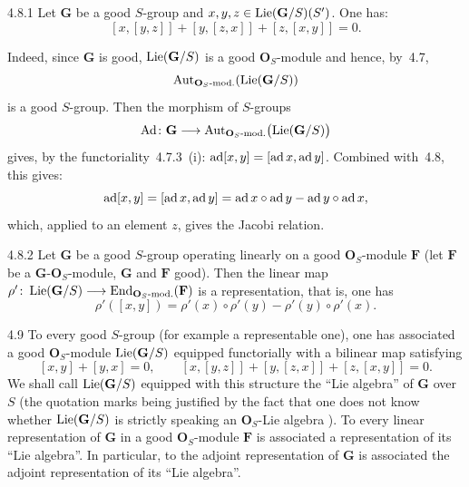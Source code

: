\begin{corollary}{4.8.1}\label{II.4.8.1}
Let \(\mathbf{G}\) be a good \(S\)-group and
\(x,y,z\in\operatorname{Lie}(\mathbf{G}/S)(S')\). One has:
\[
[x,[y,z]]+[y,[z,x]]+[z,[x,y]]=0.
\]
\end{corollary}

{\renewcommand{\thefootnote}{(82)}}
Indeed, since \(\mathbf{G}\) is good, \(\operatorname{Lie}(\mathbf{G}/S)\) is a good
\(\mathbf{O}_{S}\)-module and hence, by~4.7,
\[
\operatorname{Aut}_{\mathbf{O}_{S}\textup{-mod.}}(\operatorname{Lie}(\mathbf{G}/S))
\]
is a good \(S\)-group. Then
the morphism of \(S\)-groups
\[
\operatorname{Ad}\colon\mathbf{G}\longrightarrow
\operatorname{Aut}_{\mathbf{O}_{S}\textup{-mod.}}\bigl(\operatorname{Lie}(\mathbf{G}/S)\bigr)
\]
gives, by the functoriality~4.7.3~(i): \({\operatorname{ad}}[x,y]=[{\operatorname{ad}}\,x,{\operatorname{ad}}\,y]\). Combined with~4.8,
this gives:
\[
{\operatorname{ad}}[x,y]=[{\operatorname{ad}}\,x,{\operatorname{ad}}\,y]={\operatorname{ad}}\,x\circ{\operatorname{ad}}\,y-{\operatorname{ad}}\,y\circ{\operatorname{ad}}\,x,
\]
which, applied to an element \(z\), gives the Jacobi relation.

\begin{corollary}{4.8.2}\label{II.4.8.2}
Let \(\mathbf{G}\) be a good \(S\)-group operating linearly on a good
\(\mathbf{O}_{S}\)-module \(\mathbf{F}\) (\ie let \(\mathbf{F}\) be a
\(\mathbf{G}\)-\(\mathbf{O}_{S}\)-module, \(\mathbf{G}\) and \(\mathbf{F}\) good).
Then the linear map
\(\rho'\colon\operatorname{Lie}(\mathbf{G}/S)\longrightarrow\operatorname{End}_{\mathbf{O}_{S}\textup{-mod.}}(\mathbf{F})\) is a
representation, that is, one has
\[
\rho'([x,y])=\rho'(x)\circ\rho'(y)-\rho'(y)\circ\rho'(x).
\]
\end{corollary}

\begin{scholium}{4.9}\label{II.4.9}
To every good \(S\)-group (for example a representable one), one has associated a good
\(\mathbf{O}_{S}\)-module \(\operatorname{Lie}(\mathbf{G}/S)\) equipped functorially with a bilinear
map satisfying
\[
[x,y]+[y,x]=0,
\qquad
[x,[y,z]]+[y,[z,x]]+[z,[x,y]]=0.
\]
We shall call \(\operatorname{Lie}(\mathbf{G}/S)\) equipped with this structure the ``Lie algebra''
of \(\mathbf{G}\) over \(S\) (the quotation marks being justified by the fact that one
does not know whether \(\operatorname{Lie}(\mathbf{G}/S)\) is strictly speaking an
\(\mathbf{O}_{S}\)-Lie algebra%
{\renewcommand{\thefootnote}{(83)}}).
To every linear representation of \(\mathbf{G}\) in a good \(\mathbf{O}_{S}\)-module
\(\mathbf{F}\) is associated a representation of its ``Lie algebra''. In particular,
to the adjoint representation of \(\mathbf{G}\) is associated the adjoint
representation of its ``Lie algebra''.
\end{scholium}

